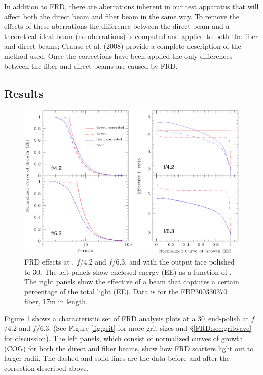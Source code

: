 In addition to FRD, there are aberrations inherent in our test
apparatus that will affect both the direct beam and fiber beam in the
same way. To remove the effects of these aberrations the difference
between the direct beam and a theoretical ideal beam (no aberrations)
is computed and applied to both the fiber and direct beams; Crause et
al. (2008)\cite{Crause_08} provide a complete description of the
method used. Once the corrections have been applied the only
differences between the fiber and direct beams are caused by FRD.

\subsection{Results}
\label{FRD:sec:results}

\begin{figure}[ht]
\begin{center}
\includegraphics[width=\textwidth, trim=0 2.6in 0 0, clip=true]{FRD/figs/basic_FRD.eps}
\caption{\fixspacing\label{fig:basicFRD} FRD effects at \filty, $f$/4.2 and
  $f$/6.3, and with the output face polished to 30\mum. The left
  panels show enclosed energy (EE) as a function of \fratio. The right
  panels show the effective \fratio of a beam that captures a certain
  percentage of the total light (EE). Data is for the FBP300330370
  fiber, 17m in length.}
\end{center}
\end{figure}

Figure \ref{fig:basicFRD} shows a characteristic set of FRD analysis
plots at a 30\mum\ end-polish at $f$/4.2 and $f$/6.3.  (See Figure
\ref{fig:grit} for more grit-sizes and \S\ref{FRD:sec:gritwave} for
discussion).  The left panels, which consist of normalized curves of
growth (COG) for both the direct and fiber beams, show how FRD
scatters light out to larger radii. The dashed and solid lines are the
data before and after the correction described above\cite{Crause_08}.

